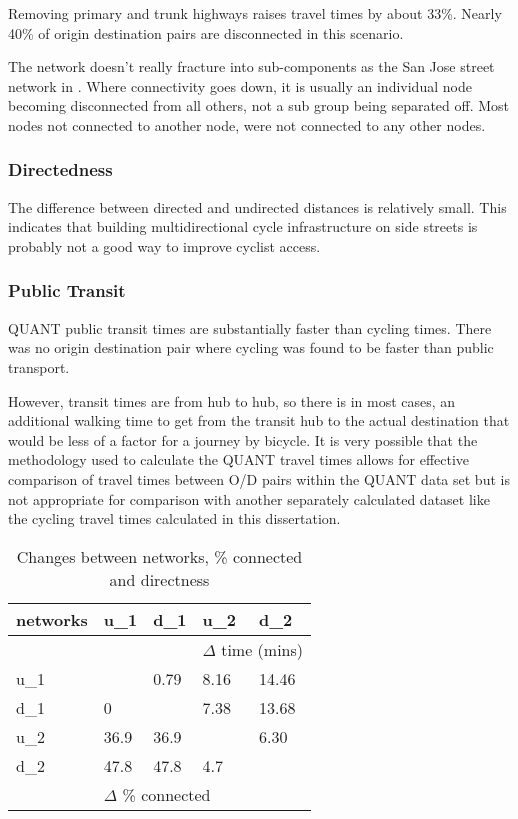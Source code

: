 Removing primary and trunk highways raises travel times by about 33\%. Nearly 40\% of origin destination pairs are disconnected in this scenario. 

The network doesn't really fracture into sub-components as the San Jose street network in \textcite{furth2016network}. Where connectivity goes down, it is usually an individual node becoming disconnected from all others, not a sub group being separated off. Most nodes not connected to another node, were not connected to any other nodes. 

\subsubsection{Directedness}

The difference between directed and undirected distances is relatively small. This indicates that building multidirectional cycle infrastructure on side streets is probably not a good way to improve cyclist access.  


\subsubsection{Public Transit}

QUANT public transit times are substantially faster than cycling times. There was no origin destination pair where cycling was found to be faster than public transport. 

However, transit times are from hub to hub, so there is in most cases, an additional walking time to get from the transit hub to the actual destination that would be less of a factor for a journey by bicycle. It is very possible that the methodology used to calculate the QUANT travel times allows for effective comparison of travel times between O/D pairs within the QUANT data set but is not appropriate for comparison with another separately calculated dataset like the cycling travel times calculated in this dissertation. 

\begin{table}
\centering
\begin{tabular}{@{}lllll@{}}
\toprule
networks & u\_1   & d\_1  & u\_2            & d\_2          \\ \midrule
         &        &       & \multicolumn{2}{l}{$\Delta$ time (mins)}  \\
u\_1     &       &  0.79 & 8.16            & 14.46         \\
d\_1     & 0      &      & 7.38            & 13.68         \\
u\_2     & 36.9   & 36.9  &                & 6.30          \\
d\_2     & 47.8   & 47.8  & 4.7             &              \\
         & \multicolumn{3}{l}{$\Delta$ \% connected} &               \\ \bottomrule
\end{tabular}
\caption{Changes between networks, \% connected and directness}
\label{table:change between nets}
\end{table}


